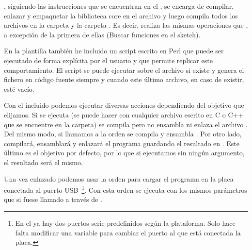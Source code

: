 , siguiendo las instrucciones que se encuentran en el , se encarga de compilar, enlazar y empaquetar la biblioteca core en el archivo  y luego compila todos los archivos en la carpeta  y la carpeta . Es decir, realiza las mismas operaciones que , a excepción de la primera de ellas (Buscar funciones en el sketch).

En la plantilla también he incluido un script escrito en Perl que puede ser ejecutado de forma explícita por el usuario y que permite replicar este comportamiento. El script se puede ejecutar sobre el archivo  si existe y genera el fichero en código fuente  siempre y cuando este último archivo, en caso de existir, esté vacío.

Con el  incluido podemos ejecutar diversas acciones dependiendo del objetivo que elijamos. Si se ejecuta  (se puede hacer con cualquier archivo escrito en C o C++ que se encuentre en la carpeta) se compila pero no ensambla ni enlaza el archivo . Del mismo modo, si llamamos a la orden  se compila y ensambla . Por otro lado,  compilará, ensamblará y enlazará el programa guardando el resultado en . Este último es el objetivo por defecto, por lo que si ejecutamos  sin ningún argumento, el resultado será el mismo.

Una vez enlazado podemos usar la orden  para cargar el programa en la placa conectada al puerto USB~\footnote{En el  ya hay dos puertos serie predefinidos según la plataforma. Solo hace falta modificar una variable para cambiar el puerto al que está conectada la placa.}. Con esta orden se ejecuta  con los mismos parámetros que si fuese llamado a través de .
